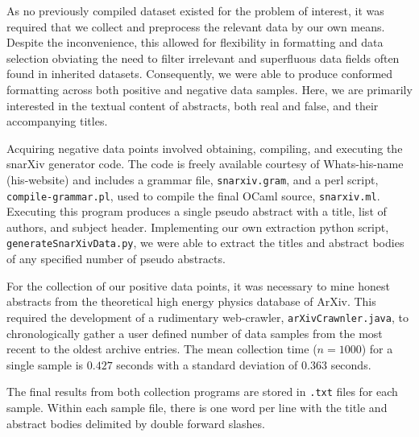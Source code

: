
As no previously compiled dataset existed for the problem of interest, it was required that we collect and preprocess the relevant data by our own means. Despite the inconvenience, this allowed for flexibility in formatting and data selection obviating the need to filter irrelevant and superfluous data fields often found in inherited datasets. Consequently, we were able to produce conformed formatting across both positive and negative data samples. Here, we are primarily interested in the textual content of abstracts, both real and false,  and their accompanying titles.

Acquiring negative data points involved obtaining, compiling, and executing the snarXiv generator code. The code is freely available courtesy of Whats-his-name (his-website) and includes a grammar file, \texttt{snarxiv.gram}, and a perl script, \texttt{compile-grammar.pl}, used to compile the final OCaml source, \texttt{snarxiv.ml}. Executing this program produces a single pseudo abstract with a title, list of authors, and subject header. Implementing our own extraction python script, \texttt{generateSnarXivData.py}, we were able to extract the titles and abstract bodies of any specified number of pseudo abstracts.

For the collection of our positive data points, it was necessary to mine honest abstracts from the theoretical high energy physics database of ArXiv. This required the development of a rudimentary web-crawler, \texttt{arXivCrawnler.java}, to chronologically gather a user defined number of data samples from the most recent to the oldest archive entries. The mean collection time ($n = 1000$) for a single sample is $0.427$ seconds with a standard deviation of $0.363$ seconds.

The final results from both collection programs are stored in \texttt{.txt} files for each sample. Within each sample file, there is one word per line with the title and abstract bodies delimited by double forward slashes.